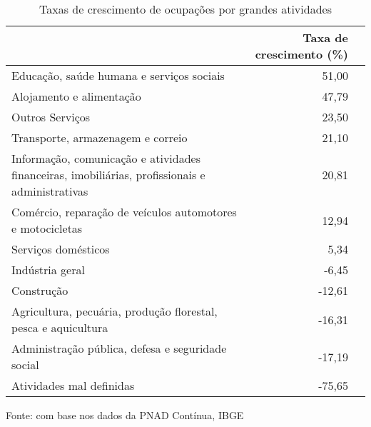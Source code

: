 \begin{table}[H]
\centering
\label{tablendeocupadosporsetor}
\begin{threeparttable}
\caption{Taxas de crescimento de ocupações por grandes atividades}
\begin{tabular}{l*{2}{r}}
\midrule \midrule
                    &Taxa de crescimento (\%)\\
\hline
Educação, saúde humana e serviços sociais&       51,00\\
Alojamento e alimentação&       47,79\\
Outros Serviços    &       23,50\\
Transporte, armazenagem e correio&       21,10\\
Informação, comunicação e atividades financeiras, imobiliárias, profissionais e administrativas&       20,81\\
Comércio, reparação de veículos automotores e motocicletas&       12,94\\
Serviços domésticos&        5,34\\
Indústria geral    &       -6,45\\
Construção        &      -12,61\\
Agricultura, pecuária, produção florestal, pesca e aquicultura&      -16,31\\
Administração pública, defesa e seguridade social&      -17,19\\
Atividades mal definidas&      -75,65\\
\bottomrule
\end{tabular}
\begin{tablenotes}
\scriptsize{Fonte: com base nos dados da PNAD Contínua, IBGE}
\end{tablenotes}
\end{threeparttable}
\end{table}
